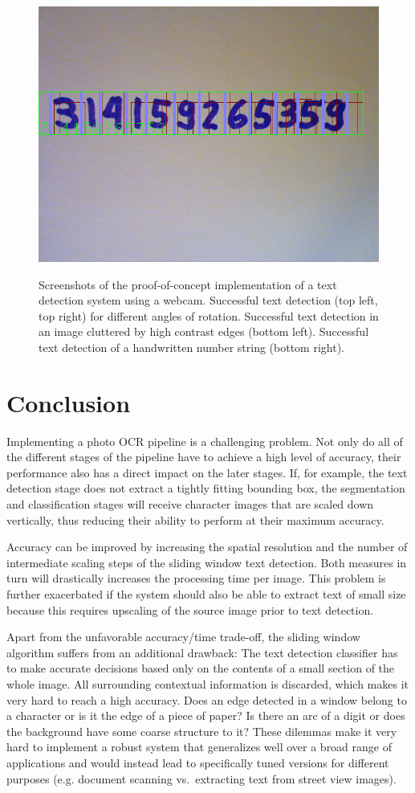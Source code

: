 \documentclass[12pt]{article}
\begin{document}
\begin{figure}[ht]
{      \includegraphics[width=0.5\linewidth]{fig/screenshots/33b6758a-5d0a-4725-8cef-74935f3d9174}
    }
    \caption
    {
      Screenshots of the proof-of-concept implementation of a text detection system using
      a webcam. Successful text detection (top left, top right) for different angles of rotation.
      Successful text detection in an image cluttered by high contrast edges (bottom left).
      Successful text detection of a handwritten number string (bottom right).
    }
    \label{fig:webcam}
\end{figure}

\section{Conclusion}
Implementing a photo OCR pipeline is a challenging problem. Not only do all of the different stages
of the pipeline have to achieve a high level of accuracy, their performance also has a direct
impact on the later stages. If, for example, the text detection stage does not extract a tightly
fitting bounding box, the segmentation and classification stages will receive character images
that are scaled down vertically, thus reducing their ability to perform at their maximum
accuracy.

Accuracy can be improved by increasing the spatial resolution and the number of intermediate scaling steps
of the sliding window text detection.
Both measures in turn will drastically increases the processing time per image. This problem is
further exacerbated if the system should also be able to extract text of small size because
this requires upscaling of the source image prior to text detection.

Apart from the unfavorable accuracy/time trade-off, the sliding window algorithm suffers from an additional
drawback: The text detection classifier has to make accurate decisions based only on the contents
of a small section of the whole image. All surrounding contextual information is discarded, which
makes it very hard to reach a high accuracy. Does an edge detected in a window belong to a character
or is it the edge of a piece of paper? Is there an arc of a digit or does the background have
some coarse structure to it? These dilemmas make it very hard
to implement a robust system that generalizes well over a broad range of applications and
would instead lead to specifically tuned versions for different purposes
(e.g. document scanning vs.\ extracting text from street view images).
\end{document}
